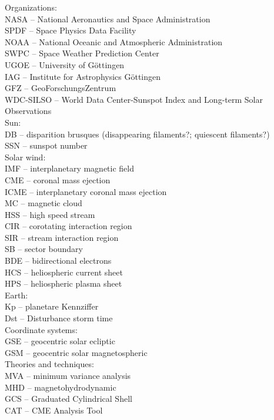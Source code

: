Organizations:\\
NASA -- National Aeronautics and Space Administration\\
	SPDF -- Space Physics Data Facility\\
NOAA -- National Oceanic and Atmospheric Administration\\
	SWPC -- Space Weather Prediction Center\\
UGOE -- University of Göttingen\\
IAG -- Institute for Astrophysics Göttingen\\
GFZ -- GeoForschungsZentrum\\
WDC-SILSO -- World Data Center-Sunspot Index and Long-term Solar Observations\\

Sun:\\
DB -- disparition brusques (disappearing filaments?; quiescent filaments?)\\
SSN -- sunspot number\\

Solar wind:\\
IMF -- interplanetary magnetic field\\
CME -- coronal mass ejection\\
ICME -- interplanetary coronal mass ejection\\
MC -- magnetic cloud\\
HSS -- high speed stream\\
CIR -- corotating interaction region\\
SIR -- stream interaction region\\
SB -- sector boundary\\
BDE -- bidirectional electrons\\
HCS -- heliospheric current sheet\\
HPS -- heliospheric plasma sheet\\

Earth:\\
Kp -- planetare Kennziffer\\
Dst -- Disturbance storm time\\

Coordinate systems:\\
GSE -- geocentric solar ecliptic\\
GSM -- geocentric solar magnetospheric\\

Theories and techniques:\\
MVA -- minimum variance analysis\\
MHD -- magnetohydrodynamic\\
GCS -- Graduated Cylindrical Shell\\
CAT -- CME Analysis Tool\\
